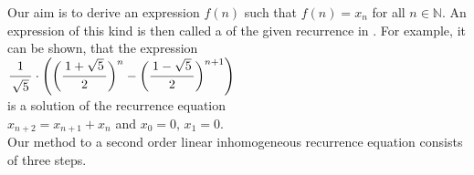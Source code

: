 \noindent
Our aim is to derive an expression $f(n)$ such that $f(n) = x_n$ for all $n\in\mathbb{N}$.  An expression of
this kind is then called a  of the given recurrence in .  For example, it can
be shown, that the expression
\\[0.2cm]
\hspace*{1.3cm}
$\ds \bruch{1}{\sqrt{5}} \cdot \left(\biggl(\bruch{1+\sqrt{5}}{2}\biggr)^{n} - \biggl(\bruch{1-\sqrt{5}}{2}\biggr)^{n+1}\right)$ \quad
\\[0.2cm]
is a solution of the recurrence equation 
\\[0.2cm]
\hspace*{1.3cm}
$x_{n+2} = x_{n+1} + x_n$ \quad and \quad $x_0 = 0$, $x_1 = 0$.
\\[0.2cm]
Our method to  a second order linear inhomogeneous recurrence equation consists of three steps.
